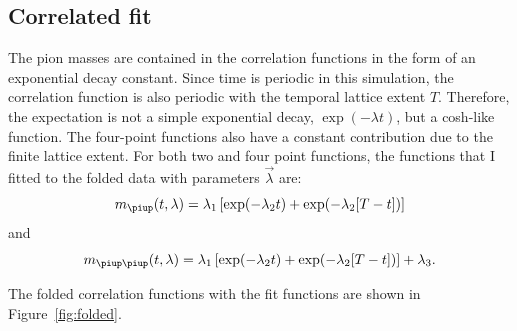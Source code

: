 \documentclass[11pt, english, fleqn, DIV=10, headinclude]{scrartcl}
\begin{document}
\subsection{Correlated fit}
\label{sec:correlated_fit}

The pion masses are contained in the correlation functions in the form of an
exponential decay constant. Since time is periodic in this simulation, the
correlation function is also periodic with the temporal lattice extent $T$.
Therefore, the expectation is not a simple exponential decay, $\exp(-\lambda
t)$, but a cosh-like function. The four-point functions also have a constant
contribution due to the finite lattice extent. For both two and four point
functions, the functions that I fitted to the folded data with parameters $\vec
\lambda$ are:
\begin{equation}
    \label{eq:fit2}
    m_\piup(t, \lambda) = \lambda_1 \sbr{\exp(-\lambda_2 t) + \exp(-\lambda_2
    [T - t])}
\end{equation}
and
\begin{equation}
    \label{eq:fit4}
    m_{\piup\piup}(t, \lambda) = \lambda_1 \sbr{\exp(-\lambda_2 t) + \exp(-\lambda_2
    [T - t])} + \lambda_3.
\end{equation}

The folded correlation functions with the fit functions are shown in
Figure~\ref{fig:folded}.
\end{document}
